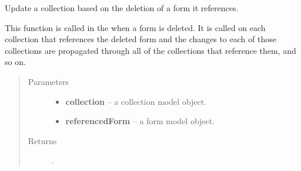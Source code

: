 \documentclass[letterpaper,10pt,english]{sphinxmanual}
\begin{document}
\begin{fulllineitems}
\label{api:onlinelinguisticdatabase.controllers.oldcollections.updateCollectionByDeletionOfReferencedForm}
Update a collection based on the deletion of a form it references.

This function is called in the  when a form is
deleted.  It is called on each collection that references the deleted form
and the changes to each of those collections are propagated through all of
the collections that reference them, and so on.
\begin{quote}\begin{description}
\item[{Parameters}] \leavevmode\begin{itemize}
\item {} 
\textbf{collection} -- a collection model object.

\item {} 
\textbf{referencedForm} -- a form model object.

\end{itemize}

\item[{Returns}] \leavevmode
{}.

\end{description}\end{quote}

\end{fulllineitems}

\end{document}
